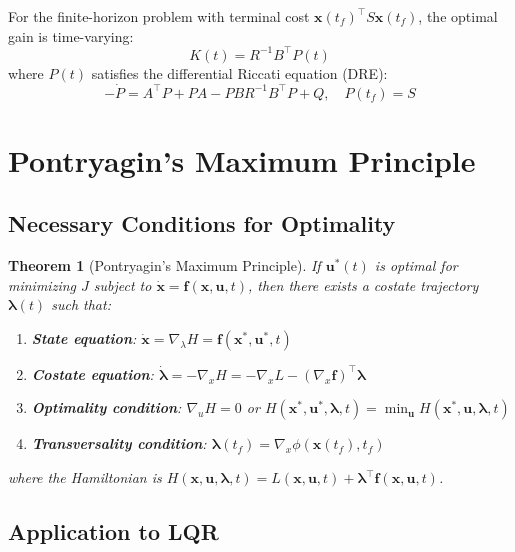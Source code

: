 \documentclass[a4paper, 11pt]{article}
\newtheorem{theorem}{Theorem}[section]
\begin{document}
For the finite-horizon problem with terminal cost $\mathbf{x}(t_f)^\top S \mathbf{x}(t_f)$,
the optimal gain is time-varying:
\begin{equation}
K(t) = R^{-1}B^\top P(t)
\end{equation}
where $P(t)$ satisfies the differential Riccati equation (DRE):
\begin{equation}
-\dot{P} = A^\top P + PA - PBR^{-1}B^\top P + Q, \quad P(t_f) = S
\end{equation}

\section{Pontryagin's Maximum Principle}

\subsection{Necessary Conditions for Optimality}

\begin{theorem}[Pontryagin's Maximum Principle]
If $\mathbf{u}^*(t)$ is optimal for minimizing $J$ subject to $\dot{\mathbf{x}} = \mathbf{f}(\mathbf{x}, \mathbf{u}, t)$,
then there exists a costate trajectory $\boldsymbol{\lambda}(t)$ such that:
\begin{enumerate}
\item \textbf{State equation}: $\dot{\mathbf{x}} = \nabla_\lambda H = \mathbf{f}(\mathbf{x}^*, \mathbf{u}^*, t)$
\item \textbf{Costate equation}: $\dot{\boldsymbol{\lambda}} = -\nabla_x H = -\nabla_x L - (\nabla_x \mathbf{f})^\top \boldsymbol{\lambda}$
\item \textbf{Optimality condition}: $\nabla_u H = 0$ or $H(\mathbf{x}^*, \mathbf{u}^*, \boldsymbol{\lambda}, t) = \min_\mathbf{u} H(\mathbf{x}^*, \mathbf{u}, \boldsymbol{\lambda}, t)$
\item \textbf{Transversality condition}: $\boldsymbol{\lambda}(t_f) = \nabla_x \phi(\mathbf{x}(t_f), t_f)$
\end{enumerate}
where the Hamiltonian is $H(\mathbf{x}, \mathbf{u}, \boldsymbol{\lambda}, t) = L(\mathbf{x}, \mathbf{u}, t) + \boldsymbol{\lambda}^\top \mathbf{f}(\mathbf{x}, \mathbf{u}, t)$.
\end{theorem}

\subsection{Application to LQR}
\end{document}
